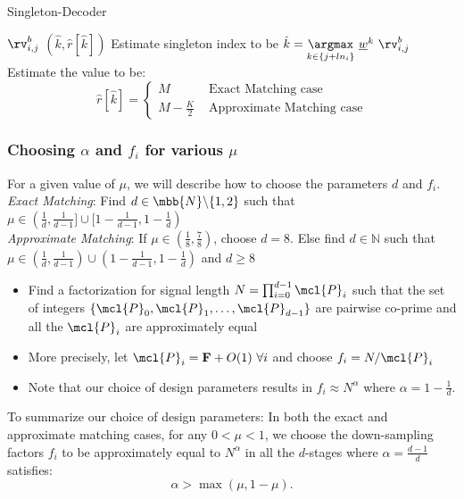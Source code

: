 \begin{enumerate}
\begin{algorithm}[h!]
\caption{Singleton-Decoder}
\label{Algo:SingletonDecoder}
\begin{algorithmic}
 $\rv^b_{i,j}$
\vspace{\gap}
 $(\hat{k},\hat{r}[\hat{k}])$
\vspace{\gap}
\State Estimate singleton index to be $ \hat{k} = \underset{k\in\{j+l n_i\}}{\argmax}\  \underline{w}^{k} ~ \rv^{b}_{i,j}$
\vspace{\gap}
  \State Estimate the value to be:$$ \hat{r}[\hat{k}]=
   \begin{cases}
   M & \text{ Exact Matching case}\\
  M-\frac{K}{2} & \text{ Approximate Matching case}
  \end{cases}
  $$
\end{algorithmic}
\end{algorithm}

\subsubsection{Choosing $\alpha$ and $f_i$ for various $\mu$}
\label{subsec:DesignParameters}
For a given value of $\mu$, we will describe how to choose the parameters $d$ and $f_i$.\\
{\it Exact Matching}: Find $d\in \mbb{N}\backslash \{1,2\}$ such that $\mu\in(\frac{1}{d},\frac{1}{d-1}]\cup[1-\frac{1}{d-1},1-\frac{1}{d})$\\
{\it Approximate Matching}: If $\mu\in(\frac{1}{8},\frac{7}{8})$, choose $d=8$. Else find $d\in\mathbb{N}$ such that $\mu\in(\frac{1}{d},\frac{1}{d-1})\cup(1-\frac{1}{d-1},1-\frac{1}{d})$ and $d\geq 8$ 
\begin{itemize}
\item Find a factorization for signal length $N=\prod_{i=0}^{d-1} \mcl{P}_i$ such that the set of integers $\{\mcl{P}_0,\mcl{P}_1,\ldots,\mcl{P}_{d-1}\}$ are pairwise co-prime and all the $\mcl{P}_i$ are approximately equal
\item More precisely, let $\mcl{P}_i=\mathbf{F}+O(1) ~\forall i$ and choose $f_i=N/\mcl{P}_i$
\item Note that our choice of design parameters results in $f_i\approx N^{\alpha}$ where $\alpha=1-\frac{1}{d}$.
\end{itemize} 
To summarize our choice of design parameters: In both the exact and approximate matching cases, for any $0<\mu<1$, we choose the down-sampling factors $f_i$ to be approximately equal to $N^{\alpha}$ in all the $d$-stages where $\alpha=\frac{d-1}{d}$ satisfies:
\begin{equation}
\label{Eqn:IneqMuAlpha}
\alpha>\max(\mu,1-\mu).
\end{equation}


\end{enumerate}
